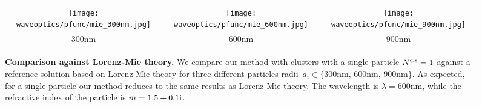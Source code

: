 \begin{figure}[!ht]
    \centering
    \setlength{\resLen}{2.2in}
    \addtolength{\tabcolsep}{-6pt}
    \begin{tabular}{ccc}
        \texttt{[image: waveoptics/pfunc/mie\_300nm.jpg]} & 
        \texttt{[image: waveoptics/pfunc/mie\_600nm.jpg]} &  
        \texttt{[image: waveoptics/pfunc/mie\_900nm.jpg]} 
        \\ 
        300nm & 600nm & 900nm
    \end{tabular}
    \caption[Comparison against Lorenz-Mie theory]{\label{fig:waveoptics:mie}
    	\textbf{Comparison against Lorenz-Mie theory.} We compare our method with clusters with a single particle $N^\mathrm{cls}=1$ against a reference solution based on Lorenz-Mie theory for three different particles radii~$a_i \in \{ \text{300nm, 600nm, 900nm} \}$. As expected, for a single particle our method reduces to the same results as Lorenz-Mie theory. The wavelength is $\lambda=600$nm, while the refractive index of the particle is $m=1.5+0.1\mathrm{i}$.  
	}
\end{figure}
